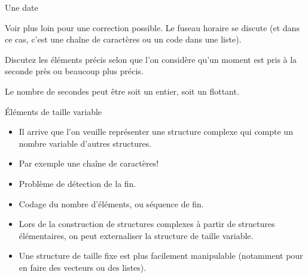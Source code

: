 \begin{exercice}
\begin{exercicelet}{Une date}
\begin{questions}
\begin{correction}
        Voir plus loin pour une correction possible. Le fuseau horaire se
        discute (et dans ce cas, c'est une chaîne de caractères ou un code
        dans une liste).
      \end{correction}
    \item Discutez les éléments précis selon que l'on considère qu'un moment
      est pris à la seconde près ou beaucoup plus précis.
      \begin{correction}
        Le nombre de secondes peut être soit un entier, soit un flottant.
      \end{correction}
    \end{questions}
  \end{exercicelet}
\end{exercice}
\begin{frame}{Éléments de taille variable}
  \begin{itemize}
  \item[\ddialogquestion] Il arrive que l'on veuille représenter une structure
    complexe qui compte un nombre variable d'autres structures.
  \item[\dialoginformation] Par exemple une chaîne de caractères!
  \item Problème de détection de la fin.
  \item Codage du nombre d'éléments, ou séquence de fin.
  \item[\ddialogwarning] Lors de la construction de structures complexes à
    partir de structures élémentaires, on peut externaliser la structure de
    taille variable.
  \item[\ddialoginformation] Une structure de taille fixe est plus facilement
    manipulable (notamment pour en faire des vecteurs ou des listes).
  \end{itemize}
\end{frame}
